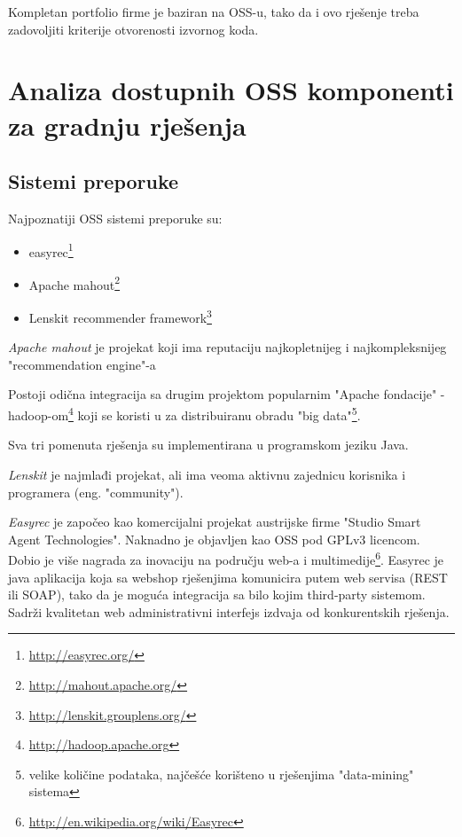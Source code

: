 \documentclass[times, utf8, seminar]{fit}
\begin{document}
Kompletan portfolio firme je baziran na OSS-u, tako da i ovo rješenje treba zadovoljiti kriterije otvorenosti izvornog koda.

\chapter{Analiza dostupnih OSS komponenti za gradnju rješenja}

\section{Sistemi preporuke}

Najpoznatiji OSS sistemi preporuke su:

\begin{itemize}
  \item easyrec\footnote{\url{http://easyrec.org/}}
  \item Apache mahout\footnote{\url{http://mahout.apache.org/}}
  \item Lenskit recommender framework\footnote{\url{http://lenskit.grouplens.org/}}
\end{itemize}

\emph{Apache mahout} je projekat koji ima reputaciju najkopletnijeg i najkompleksnijeg "recommendation engine"-a 

Postoji odična integracija sa drugim projektom popularnim "Apache fondacije" - hadoop-om\footnote{\url{http://hadoop.apache.org}} koji se koristi u za distribuiranu obradu "big data"\footnote{velike količine podataka, najčešće korišteno u  rješenjima "data-mining" sistema}.

Sva tri pomenuta rješenja su implementirana u programskom jeziku Java.

\emph{Lenskit} je najmlađi projekat, ali ima veoma aktivnu zajednicu korisnika i programera (eng. "community").

\emph{Easyrec} je započeo kao komercijalni projekat austrijske firme "Studio Smart Agent Technologies". Naknadno je objavljen kao OSS pod GPLv3 licencom. 
Dobio je više nagrada za inovaciju na području web-a i multimedije\footnote{\url{http://en.wikipedia.org/wiki/Easyrec}}. 
Easyrec je java aplikacija koja sa webshop rješenjima komunicira putem web servisa (REST ili SOAP), tako da je moguća integracija sa bilo kojim third-party sistemom.
Sadrži kvalitetan web administrativni interfejs izdvaja od konkurentskih rješenja.
\end{document}
